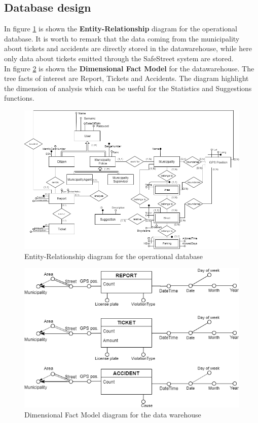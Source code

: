 \documentclass[a4paper]{report}
\begin{document}
\subsection{Database design}
\label{sec:db-design}
In figure \ref{fig:er} is shown the \textbf{Entity-Relationship} diagram for the operational database. It is worth to remark that the data coming from the municipality about tickets and accidents are directly stored in the datawarehouse, while here only data about tickets emitted through the SafeStreet system are stored.\\
In figure \ref{fig:dfm} is shown the \textbf{Dimensional Fact Model} for the datawarehouse. The tree facts of interest are Report, Tickets and Accidents. The diagram highlight the dimension of analysis which can be useful for the Statistics and Suggestions functions.
\begin{figure}[htp]
\includegraphics[scale=2.4]{ER}
\caption{Entity-Relationship diagram for the operational database}
\label{fig:er}
\end{figure}
\begin{figure}[htp]
\includegraphics[width=\textwidth]{DFM}
\caption{Dimensional Fact Model diagram for the data warehouse}
\label{fig:dfm}
\end{figure}
\end{document}
